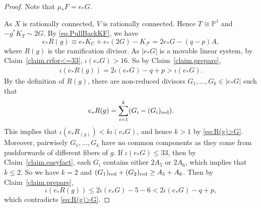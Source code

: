 \documentclass[10pt,a4paper]{amsart}
\begin{document}
    \begin{proof}
        Note that $\mu_*F=e_*G$. 
        
        As $X$ is rationally connected, $V$ is rationally connected. Hence $T\cong\mathbb{P}^1$ and $-g^*K_T\sim 2G$. By \eqref{eq.PullBackKF}, we have
        \begin{equation}\label{eq.eR}
            e_*R(g)\equiv e_*K_U+e_*(2G)-K_{\mathcal F}=2e_*G-(q-p)A,
        \end{equation}
        where $R(g)$ is the ramification divisor. As $|e_*G|$ is a movable linear system, by Claim~\ref{claim.rrfor<=33}, $\iota(e_*G)>16$.  So by Claim~\ref{claim.prepare}, 
        \begin{align}
            \iota(e_*R(g))=2\iota(e_*G)-q+p>\iota(e_*G). \label{eq:R(g)>G}
        \end{align}
        By the definition of $R(g)$, there are non-reduced divisors $G_1,\dots, G_k\in |e_*G|$ such that
        \[
            e_*R(g)=\sum_{i=1}^k(G_i-(G_i)_{\text{\rm red}}).
        \]
        This implies that $\iota(e_*R_(g))<k\iota(e_*G)$, and hence $k>1$ by \eqref{eq:R(g)>G}. Moreover, pairwisely $G_1, \dots, G_k$ have no common components as they come from pushforwards of different fibers of $g$. If $\iota(e_*G)\leq 33$, then by Claim~\ref{claim.easyfact}, each $G_i$ contains either $2A_5$ or $2A_6$, which implies that $k\leq 2$. So we have $k=2$ and $(G_1)_{\text{\rm red}}+(G_2)_{\text{\rm red}}\geq A_5+A_6$. Then by Claim~\ref{claim.prepare},
        \[
            \iota(e_*R(g))\leq 2\iota(e_*G)-5-6<2\iota(e_*G)-q+p,
        \]
        which contradicts \eqref{eq:R(g)>G}.
    \end{proof}
\end{document}
